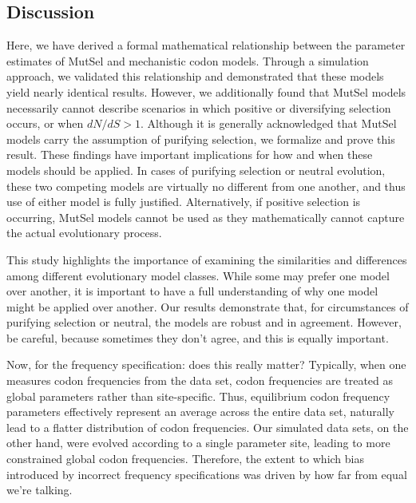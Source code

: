 \documentclass[11pt]{article}
\begin{document}
\subsection*{Discussion}

Here, we have derived a formal mathematical relationship between the parameter estimates of MutSel and mechanistic codon models. Through a simulation approach, we validated this relationship and demonstrated that these models yield nearly identical results. However, we additionally found that MutSel models necessarily cannot describe scenarios in which positive or diversifying selection occurs, or when $dN/dS > 1$. Although it is generally acknowledged that MutSel models carry the assumption of purifying selection, we formalize and prove this result. These findings have important implications for how and when these models should be applied. In cases of purifying selection or neutral evolution, these two competing models are virtually no different from one another, and thus use of either model is fully justified. Alternatively, if positive selection is occurring, MutSel models cannot be used as they mathematically cannot capture the actual evolutionary process.

This study highlights the importance of examining the similarities and differences among different evolutionary model classes. While some may prefer one model over another, it is important to have a full understanding of why one model might be applied over another. Our results demonstrate that, for circumstances of purifying selection or neutral, the models are robust and in agreement. However, be careful, because sometimes they don't agree, and this is equally important.


Now, for the frequency specification: does this really matter? Typically, when one measures codon frequencies from the data set, codon frequencies are treated as global parameters rather than site-specific. Thus, equilibrium codon frequency parameters effectively represent an average across the entire data set, naturally lead to a flatter distribution of codon frequencies. Our simulated data sets, on the other hand, were evolved according to a single parameter site, leading to more constrained global codon frequencies. Therefore, the extent to which bias introduced by incorrect frequency specifications was driven by how far from equal we're talking.
\end{document}
